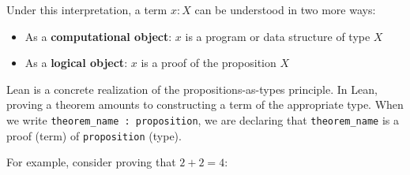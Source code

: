 Under this interpretation, a term $x : X$ can be understood in two more ways:
\begin{itemize}
    \item As a \textbf{computational object}: $x$ is a program or data structure of type $X$
    \item As a \textbf{logical object}: $x$ is a proof of the proposition $X$
\end{itemize}

Lean is a concrete realization of the propositions-as-types principle.
In Lean, proving a theorem amounts to constructing a term of the appropriate type. 
When we write \lstinline[language=lean]|theorem_name : proposition|, we are declaring that 
\lstinline[language=lean]|theorem_name| is a proof (term) of \lstinline[language=lean]|proposition| (type). 

For example, consider proving that $2 + 2 = 4$:

